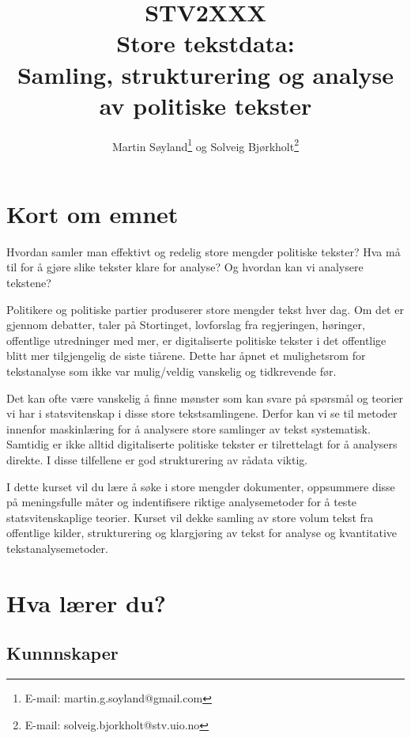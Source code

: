 \documentclass[12pt,a4paper,norsk]{article}
\begin{document}
\author{Martin S{\o}yland\footnote{E-mail: martin.g.soyland@gmail.com} og
        Solveig Bj{\o}rkholt\footnote{E-mail: solveig.bjorkholt@stv.uio.no}}
\title{\LARGE{STV2XXX \\ Store tekstdata}: \\ \large{Samling, strukturering og analyse av politiske tekster}}
\maketitle

\section*{Kort om emnet}
Hvordan samler man effektivt og redelig store mengder politiske tekster? Hva må til for å gjøre slike tekster klare for analyse? Og hvordan kan vi analysere tekstene?

Politikere og politiske partier produserer store mengder tekst hver dag. Om det er gjennom debatter, taler på Stortinget, lovforslag fra regjeringen, høringer, offentlige utredninger med mer, er digitaliserte politiske tekster i det offentlige blitt mer tilgjengelig de siste tiårene. Dette har åpnet et mulighetsrom for tekstanalyse som ikke var mulig/veldig vanskelig og tidkrevende før.

Det kan ofte være vanskelig å finne mønster som kan svare på spørsmål og teorier vi har i statsvitenskap i disse store tekstsamlingene. Derfor kan vi se til metoder innenfor maskinlæring for å analysere store samlinger av tekst systematisk. Samtidig er ikke alltid digitaliserte politiske tekster er tilrettelagt for å analysers direkte. I disse tilfellene er god strukturering av rådata viktig.

I dette kurset vil du lære å søke i store mengder dokumenter, oppsummere disse på meningsfulle måter og indentifisere riktige analysemetoder for å teste statsvitenskaplige teorier. Kurset vil dekke samling av store volum tekst fra offentlige kilder, strukturering og klargjøring av tekst for analyse og kvantitative tekstanalysemetoder.

\section*{Hva lærer du?}

\subsection*{Kunnnskaper}
\end{document}
